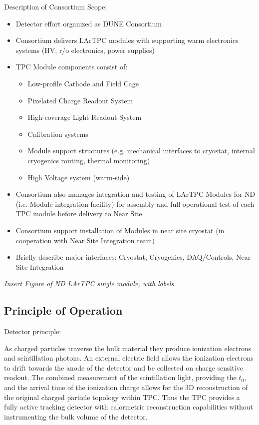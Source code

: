 Description of Consortium Scope:
\begin{itemize}
\item Detector effort organized as DUNE Consortium
\item Consortium delivers LArTPC modules with supporting warm electronics systems (HV, r/o electronics, power supplies)
\item TPC Module components consist of:
\begin{itemize}
    \item Low-profile Cathode and Field Cage
    \item Pixelated Charge Readout System
    \item High-coverage Light Readout System
    \item Calibration systems
    \item Module support structures (e.g. mechanical interfaces to cryostat, internal cryogenics routing, thermal monitoring)
    \item High Voltage system (warm-side)
\end{itemize}
\item Consortium also manages integration and testing of LArTPC Modules for ND (i.e. Module integration facility) for assembly and full operational test of each TPC module before delivery to Near Site.
\item Consortium support installation of Modules in near site cryostat (in cooperation with Near Site Integration team)
\item Briefly describe major interfaces: Cryostat, Cryogenics, DAQ/Controls, Near Site Integration
\end{itemize}

{\it Insert Figure of ND LArTPC single module, with labels.}


\subsection{Principle of Operation}
\label{sec:lartpc-ovvw-op}

Detector principle:

As charged particles traverse the bulk material they produce ionization electrons and scintillation photons. An external electric field allows the ionization electrons to drift towards the anode of the detector and be collected on charge sensitive readout. The combined measurement of the scintillation light, providing the $t_0$, and the arrival time of the ionization charge allows for the 3D reconstruction of the original charged particle topology within TPC. Thus the TPC provides a fully active tracking detector with calormetric reconstruction capabilities without instrumenting the bulk volume of the detector.


